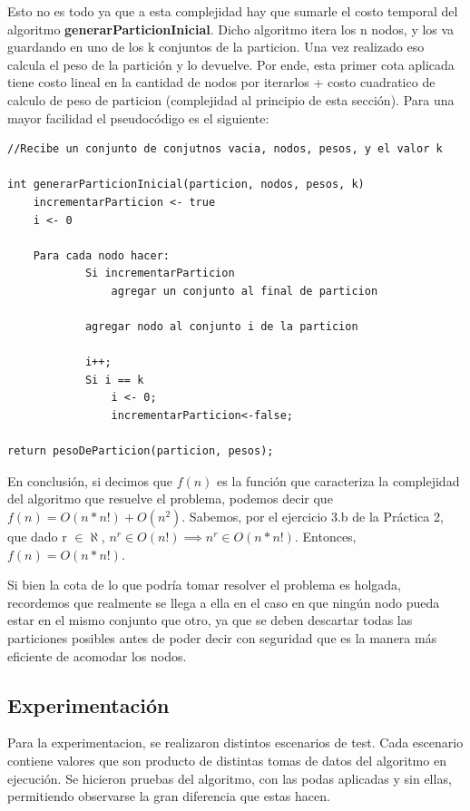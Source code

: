 Esto no es todo ya que a esta complejidad hay que sumarle el costo temporal del algoritmo \textbf{generarParticionInicial}. Dicho algoritmo itera los n nodos, y los va guardando en uno de los k conjuntos de la particion. Una vez realizado eso calcula el peso de la partición y lo devuelve.
Por ende, esta primer cota aplicada tiene costo lineal en la cantidad de nodos por iterarlos + costo cuadratico de calculo de peso de particion (complejidad al principio de esta sección). Para una mayor facilidad el pseudocódigo es el siguiente:

\begin{lstlisting}
//Recibe un conjunto de conjutnos vacia, nodos, pesos, y el valor k

int generarParticionInicial(particion, nodos, pesos, k)
	incrementarParticion <- true
	i <- 0

	Para cada nodo hacer:
			Si incrementarParticion
				agregar un conjunto al final de particion

			agregar nodo al conjunto i de la particion

			i++;
			Si i == k
				i <- 0;
				incrementarParticion<-false;

return pesoDeParticion(particion, pesos);
\end{lstlisting}

En conclusión, si decimos que $f(n)$ es la función que caracteriza la complejidad del algoritmo que resuelve el problema, podemos decir que $f(n) = O(n*n!) + O(n^2)$. Sabemos, por el ejercicio 3.b de la Práctica 2, que dado r $\in \aleph$, $n^r \in O(n!) \implies n^r \in O(n*n!)$. Entonces, $f(n) = O(n*n!)$.

Si bien la cota de lo que podría tomar resolver el problema es holgada, recordemos que realmente se llega a ella en el caso en que ningún nodo pueda estar en el mismo conjunto que otro, ya que se deben descartar todas las particiones posibles antes de poder decir con seguridad que es la manera más eficiente de acomodar los nodos.

\subsection{Experimentación}
Para la experimentacion, se realizaron distintos escenarios de test. Cada escenario contiene valores que son producto de distintas tomas de datos del algoritmo en ejecución.
Se hicieron pruebas del algoritmo, con las podas aplicadas y sin ellas, permitiendo observarse la gran diferencia que estas hacen.

